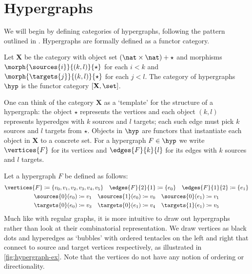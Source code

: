 \section{Hypergraphs}

We will begin by defining categories of hypergraphs, following the
pattern outlined in \cite{bonchi2022string}.
Hypergraphs are formally defined as a functor category.

\begin{definition}\label{def:hypergraph}
    Let \(\mathbf{X}\) be the category with object set
    \((\nat \times \nat) + \star\) and morphisms
    \(\morph{\sources{i}}{(k,l)}{\star}\) for each \(i < k\)
    and \(\morph{\targets{j}}{(k,l)}{\star}\) for each \(j < l\).
    The category of hypergraphs \(\hyp\) is the functor category
    \([\mathbf{X}, \set]\).
\end{definition}

One can think of the category \(\mathbf{X}\) as a `template' for the structure
of a hypergraph: the object \(\star\) represents the vertices and each object
\((k, l)\) represents hyperedges with \(k\) sources and \(l\) targets; each such
edge must pick \(k\) sources and \(l\) targets from \(\star\).
Objects in \(\hyp\) are functors that instantiate each object in \(\mathbf{X}\)
to a concrete set.
For a hypergraph \(F \in \hyp\) we write \(\vertices{F}\)
for its vertices and \(\edges{F}{k}{l}\)
for its edges with \(k\) sources and \(l\) targets.

\begin{example}\label{ex:hypergraph}
    Let a hypergraph \(F\) be defined as follows:
    \begin{gather*}
        \vertices{F} \coloneqq \{v_0,v_1,v_2,v_3,v_4,v_5\}
        \quad
        \edges{F}{2}{1} \coloneqq \{e_0\}
        \quad
        \edges{F}{1}{2} \coloneqq \{e_1\}
        \\
        \sources{0}(e_0) \coloneqq v_1
        \quad
        \sources{1}(e_0) \coloneqq v_0
        \quad
        \sources{0}(e_1) \coloneqq v_1
        \\
        \targets{0}(e_0) \coloneqq v_3
        \quad
        \targets{0}(e_1) \coloneqq v_4
        \quad
        \targets{1}(e_1) \coloneqq v_5
    \end{gather*}
    Much like with regular graphs, it is more intuitive to draw out hypergraphs
    rather than look at their combinatorial representation.
    We draw vertices as black dots and hyperedges as `bubbles' with ordered tentacles
    on the left and right that connect to source and target vertices respectively,
    as illustrated in \cref{fig:hypergraph-ex}.
    Note that the vertices do not have any notion of ordering or directionality.
\end{example}

